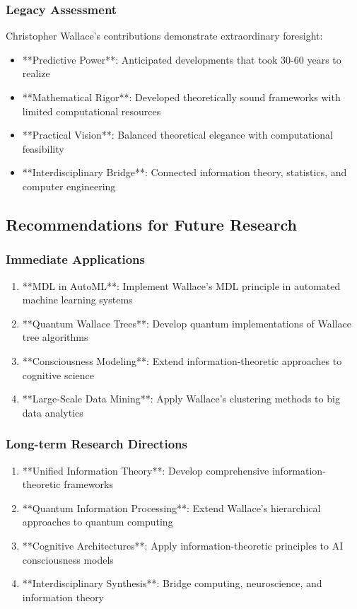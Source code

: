 \subsubsection{Legacy Assessment}

Christopher Wallace's contributions demonstrate extraordinary foresight:

\begin{itemize}
    \item **Predictive Power**: Anticipated developments that took 30-60 years to realize
    \item **Mathematical Rigor**: Developed theoretically sound frameworks with limited computational resources
    \item **Practical Vision**: Balanced theoretical elegance with computational feasibility
    \item **Interdisciplinary Bridge**: Connected information theory, statistics, and computer engineering
\end{itemize}

\subsection{Recommendations for Future Research}

\subsubsection{Immediate Applications}

\begin{enumerate}
    \item **MDL in AutoML**: Implement Wallace's MDL principle in automated machine learning systems
    \item **Quantum Wallace Trees**: Develop quantum implementations of Wallace tree algorithms
    \item **Consciousness Modeling**: Extend information-theoretic approaches to cognitive science
    \item **Large-Scale Data Mining**: Apply Wallace's clustering methods to big data analytics
\end{enumerate}

\subsubsection{Long-term Research Directions}

\begin{enumerate}
    \item **Unified Information Theory**: Develop comprehensive information-theoretic frameworks
    \item **Quantum Information Processing**: Extend Wallace's hierarchical approaches to quantum computing
    \item **Cognitive Architectures**: Apply information-theoretic principles to AI consciousness models
    \item **Interdisciplinary Synthesis**: Bridge computing, neuroscience, and information theory
\end{enumerate}


